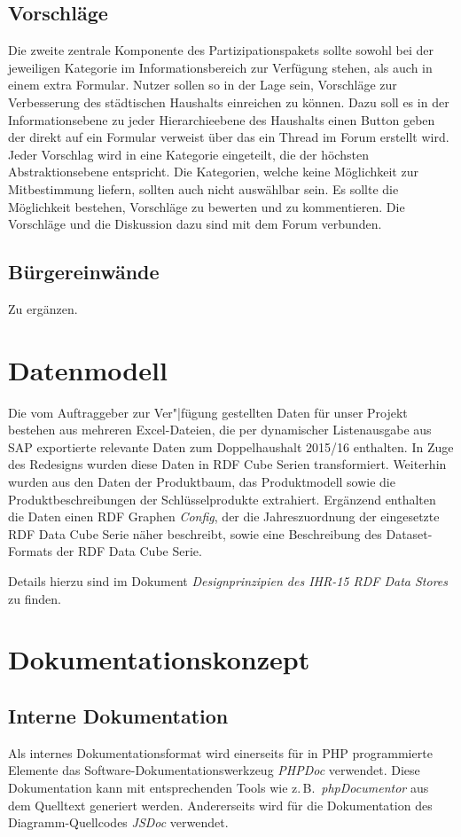 \documentclass[a4paper,11pt,twoside]{article}
\begin{document}
\subsection{Vorschläge}
Die zweite zentrale Komponente des Partizipationspakets sollte sowohl bei der
jeweiligen Kategorie im Informationsbereich zur Verfügung stehen, als auch in
einem extra Formular. Nutzer sollen so in der Lage sein, Vorschläge zur
Verbesserung des städtischen Haushalts einreichen zu können. Dazu soll es in
der Informationsebene zu jeder Hierarchieebene des Haushalts einen Button geben
der direkt auf ein Formular verweist über das ein Thread im Forum erstellt
wird. Jeder Vorschlag wird in eine Kategorie eingeteilt, die der höchsten
Abstraktionsebene entspricht. Die Kategorien, welche keine Möglichkeit zur
Mitbestimmung liefern, sollten auch nicht auswählbar sein. Es sollte die
Möglichkeit bestehen, Vorschläge zu bewerten und zu kommentieren. Die
Vorschläge und die Diskussion dazu sind mit dem Forum verbunden.

\subsection{Bürgereinwände}

Zu ergänzen. 

\section{Datenmodell}

Die vom Auftraggeber zur Ver"|fügung gestellten Daten für unser Projekt
bestehen aus mehreren Excel-Dateien, die per dynamischer Listenausgabe aus SAP
exportierte relevante Daten zum Doppelhaushalt 2015/16 enthalten.  In Zuge des
Redesigns wurden diese Daten in RDF Cube Serien transformiert.  Weiterhin
wurden aus den Daten der Produktbaum, das Produktmodell sowie die
Produktbeschreibungen der Schlüsselprodukte extrahiert.  Ergänzend enthalten
die Daten einen RDF Graphen \emph{Config}, der die Jahreszuordnung der
eingesetzte RDF Data Cube Serie näher beschreibt, sowie eine Beschreibung des
Dataset-Formats der RDF Data Cube Serie. 

Details hierzu sind im Dokument \emph{Designprinzipien des IHR-15 RDF Data
  Stores} zu finden. 

\section{Dokumentationskonzept}

\subsection{Interne Dokumentation}
Als internes Dokumentationsformat wird einerseits für in PHP programmierte
Elemente das Software-Dokumentationswerkzeug \emph{PHPDoc} verwendet. Diese
Dokumentation kann mit entsprechenden Tools wie z.\,B.\ \emph{phpDocumentor}
aus dem Quelltext generiert werden. Andererseits wird für die Dokumentation
des Diagramm-Quellcodes \emph{JSDoc} verwendet.
\end{document}

